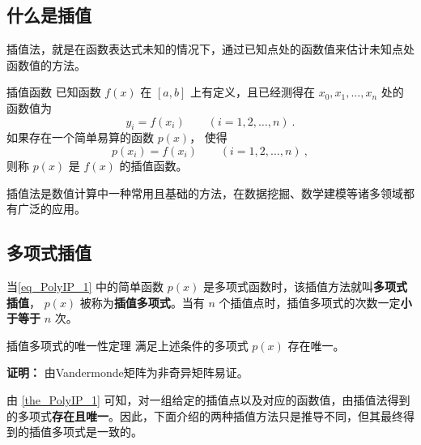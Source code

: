 
\begin{issues}
\issueTODO
\end{issues}

\subsection{什么是插值}
插值法，就是在函数表达式未知的情况下，通过已知点处的函数值来估计未知点处函数值的方法。\begin{definition}{插值函数}
已知函数 $f(x)$ 在 $\left[a,b\right] $ 上有定义，且已经测得在 $x_0,x_1,\dots, x_n$ 处的函数值为
\begin{equation}
y_i = f(x_i) \qquad (i = 1,2, \dots, n)~.
\end{equation}
如果存在一个简单易算的函数 $p(x)$， 使得
\begin{equation}
\label{eq_PolyIP_1}
p(x_i) = f(x_i)\qquad (i = 1,2, \dots, n)~,
\end{equation}
则称 $p(x)$ 是 $f(x)$ 的插值函数。
\end{definition}

插值法是数值计算中一种常用且基础的方法，在数据挖掘、数学建模等诸多领域都有广泛的应用。

\subsection{多项式插值}
当\autoref{eq_PolyIP_1} 中的简单函数 $p(x)$ 是多项式函数时，该插值方法就叫\textbf{多项式插值}， $p(x)$ 被称为\textbf{插值多项式}。当有 $n$ 个插值点时，插值多项式的次数一定\textbf{小于等于} $n$ 次。
\begin{theorem}{插值多项式的唯一性定理}\label{the_PolyIP_1}
满足上述条件的多项式 $p(x)$ 存在唯一。

\end{theorem}
\textbf{证明：} 由Vandermonde矩阵为非奇异矩阵易证。

由 \autoref{the_PolyIP_1} 可知，对一组给定的插值点以及对应的函数值，由插值法得到的多项式\textbf{存在且唯一}。因此，下面介绍的两种插值方法只是推导不同，但其最终得到的插值多项式是一致的。

